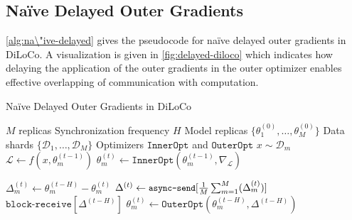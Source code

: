 
\subsection{Na\"ive Delayed Outer Gradients} 
\autoref{alg:na\"ive-delayed} gives the pseudocode for na\"ive delayed outer gradients in DiLoCo. A visualization is given in \autoref{fig:delayed-diloco} which indicates how delaying the application of the outer gradients in the outer optimizer enables effective overlapping of communication with computation.
\begin{algorithm}[!h]
\caption{Na\"ive Delayed Outer Gradients in DiLoCo} \label{alg:na\"ive-delayed}
\begin{algorithmic}[1]
\Require $M$ replicas
\Require Synchronization frequency $H$
\Require Model replicas $\{\theta^{(0)}_1, \dots, \theta^{(0)}_M\}$
\Require Data shards $\{\mathcal{D}_1, \dots, \mathcal{D}_M\}$
\Require Optimizers $\texttt{InnerOpt}$ and $\texttt{OuterOpt}$
    \State $x \sim \mathcal{D}_m$
    \State $\mathcal{L} \gets f(x, \theta_m^{(t-1)})$
    \State $\theta_m^{(t)} \gets \texttt{InnerOpt}(\theta_m^{(t-1)}, \nabla_\mathcal{L})$
    \item[]
        \State $\Delta^{(t)}_{m} \gets \theta^{(t-H)}_{m} - \theta_{m}^{(t)}$
        \State $\Delta^{(t)} \gets {\small \texttt{async-send}}[\frac{1}{M} \sum_{m=1}^M (\Delta^{(t)}_{m})]$
            \State $\texttt{block-receive}[{\Delta^{(t-H)}}]$
            \State $\theta_m^{(t)} \gets \texttt{OuterOpt}(\theta_m^{(t-H)}, \Delta^{(t-H)})$
        \EndIf
    \EndIf
\EndFor
\EndParFor
\end{algorithmic}
\end{algorithm}


